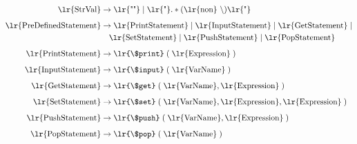 \documentclass[a4paper,12pt]{article}
\begin{document}
\begin{align*}
\text{\lr{StrVal}} &\rightarrow \text{\lr{""}} \mid \text{\lr{"}}.*(\text{\lr{non}}\ \backslash)\text{\lr{"}} \\[0.5em]
\text{\lr{PreDefinedStatement}} &\rightarrow \text{\lr{PrintStatement}} \mid \text{\lr{InputStatement}} \mid \text{\lr{GetStatement}} \mid \\
&\quad \text{\lr{SetStatement}} \mid \text{\lr{PushStatement}} \mid \text{\lr{PopStatement}} \\[0.5em]
\text{\lr{PrintStatement}} &\rightarrow \text{\lr{\$print}} \; ( \; \text{\lr{Expression}} \; ) \\[0.5em]
\text{\lr{InputStatement}} &\rightarrow \text{\lr{\$input}} \; ( \; \text{\lr{VarName}} \; ) \\[0.5em]
\text{\lr{GetStatement}} &\rightarrow \text{\lr{\$get}} \; ( \; \text{\lr{VarName}} , \text{\lr{Expression}} \; ) \\[0.5em]
\text{\lr{SetStatement}} &\rightarrow \text{\lr{\$set}} \; ( \; \text{\lr{VarName}} , \text{\lr{Expression}} , \text{\lr{Expression}} \; ) \\[0.5em]
\text{\lr{PushStatement}} &\rightarrow \text{\lr{\$push}} \; ( \; \text{\lr{VarName}} , \text{\lr{Expression}} \; ) \\[0.5em]
\text{\lr{PopStatement}} &\rightarrow \text{\lr{\$pop}} \; ( \; \text{\lr{VarName}} \; )
\end{align*}
\end{document}
